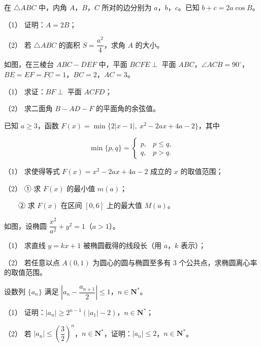 \begin{question}
在 \(\triangle ABC\) 中，内角 \(A\)，\(B\)，\(C\) 所对的边分别为 \(a\)，\(b\)，\(c\)。已知 \(b+c=2a\cos B\)。

（1） 证明：\(A=2B\)；

（2） 若 \(\triangle ABC\) 的面积 \(S=\dfrac{a^{2}}{4}\)，求角 \(A\) 的大小。

\Needspace{0.4\textheight}
\end{question}
\begin{question}
如图，在三棱台 \(ABC-DEF\) 中，平面 \(BCFE\perp\) 平面 \(ABC\)，\(\angle ACB=90^{\circ}\)，\(BE=EF=FC=1\)，\(BC=2\)，\(AC=3\)。

（1） 求证：\(BF\perp\) 平面 \(ACFD\)；

（2） 求二面角 \(B-AD-F\) 的平面角的余弦值。
\nopagebreak[4]
\begin{center}\end{center}
\nopagebreak[4]
\end{question}
\begin{question}
已知 \(a\geqslant 3\)，函数 \(F(x)=\min\{2|x-1|,\ x^{2}-2ax+4a-2\}\)，其中

\nopagebreak[4]
\[
\min\{p,q\}=\begin{cases}
p, & p\leqslant q, \\
q, & p>q.
\end{cases}
\]

（1） 求使得等式 \(F(x)=x^{2}-2ax+4a-2\) 成立的 \(x\) 的取值范围；

（2） ① 求 \(F(x)\) 的最小值 \(m(a)\)；

　　② 求 \(F(x)\) 在区间 \([0,6]\) 上的最大值 \(M(a)\)。

\Needspace{0.4\textheight}
\end{question}
\begin{question}
如图，设椭圆 \(\dfrac{x^{2}}{a^{2}}+y^{2}=1\)（\(a>1\)）。

（1） 求直线 \(y=kx+1\) 被椭圆截得的线段长（用 \(a\)，\(k\) 表示）；

（2） 若任意以点 \(A(0,1)\) 为圆心的圆与椭圆至多有 3 个公共点，求椭圆离心率的取值范围。
\nopagebreak[4]
\begin{center}\end{center}
\nopagebreak[4]
\end{question}
\begin{question}
设数列 \(\{a_{n}\}\) 满足 \(\left|a_{n}-\dfrac{a_{n+1}}{2}\right|\leqslant 1\)，\(n\in\mathbf{N}^{*}\)。

（1） 证明：\(|a_{n}|\geqslant 2^{n-1}(|a_{1}|-2)\)，\(n\in\mathbf{N}^{*}\)；

（2） 若 \(|a_{n}|\leqslant\left(\dfrac{3}{2}\right)^{n}\)，\(n\in\mathbf{N}^{*}\)，证明：\(|a_{n}|\leqslant 2\)，\(n\in\mathbf{N}^{*}\)。

\end{question}